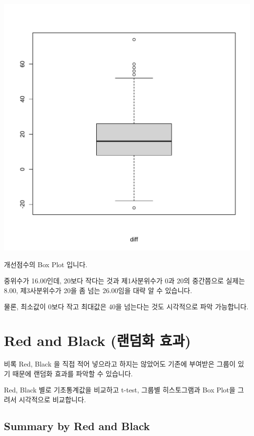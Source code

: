 \documentclass[
]{book}
\begin{document}
\includegraphics{Quiz_report_2025_files/figure-latex/unnamed-chunk-317-1.pdf}

개선점수의 Box Plot 입니다.

중위수가 16.00인데, 20보다 작다는 것과 제1사분위수가 0과 20의 중간쯤으로 실제는 8.00, 제3사분위수가 20을 좀 넘는 26.00임을 대략 알 수 있습니다.

물론, 최소값이 0보다 작고 최대값은 40을 넘는다는 것도 시각적으로 파악 가능합니다.

\section{Red and Black (랜덤화 효과)}\label{red-and-black-uxb79cuxb364uxd654-uxd6a8uxacfc}

비록 Red, Black 을 직접 적어 넣으라고 하지는 않았어도 기존에 부여받은 그룹이 있기 때문에 랜덤화 효과를 파악할 수 있습니다.

Red, Black 별로 기초통계값을 비교하고 t-test, 그룹별 히스토그램과 Box Plot을 그려서 시각적으로 비교합니다.

\subsection{Summary by Red and Black}\label{summary-by-red-and-black}
\end{document}
